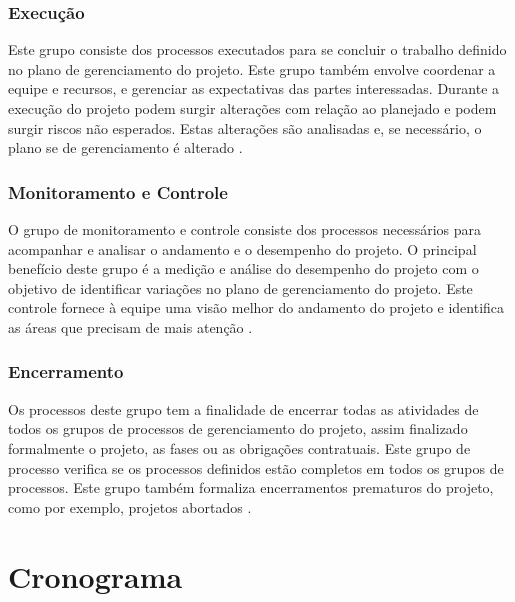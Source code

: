 \documentclass[
    12pt,               %
    openright,          %
    twoside,            %
    a4paper,            %
    chapter=TITLE,     %
    english,            %
    spanish,            %
    portuguese              %
    ]{abntex2}
\begin{document}
\subsection{Execução}
Este grupo consiste dos processos executados para se concluir o trabalho definido no plano de gerenciamento do projeto. Este grupo também envolve coordenar a equipe e recursos, e gerenciar as expectativas das partes interessadas. Durante a execução do projeto podem surgir alterações com relação ao planejado e podem surgir riscos não esperados. Estas alterações são analisadas e, se necessário, o plano se de gerenciamento é alterado \cite[p.~55]{pmi2013}.

\subsection{Monitoramento e Controle}
O grupo de monitoramento e controle consiste dos processos necessários para acompanhar e analisar o andamento e o desempenho do projeto. O principal benefício deste grupo é a medição e análise do desempenho do projeto com o objetivo de identificar variações no plano de gerenciamento do projeto. Este controle fornece à equipe uma visão melhor do andamento do projeto e identifica as áreas que precisam de mais atenção \cite[p.~55]{pmi2013}.

\subsection{Encerramento}
Os processos deste grupo tem a finalidade de encerrar todas as atividades de todos os grupos de processos de gerenciamento do projeto, assim finalizado formalmente o projeto, as fases ou as obrigações contratuais. Este grupo de processo verifica se os processos definidos estão completos em todos os grupos de processos. Este grupo também formaliza encerramentos prematuros do projeto, como por exemplo, projetos abortados \cite[p.~55]{pmi2013}.


	
\chapter{Cronograma}
\end{document}
